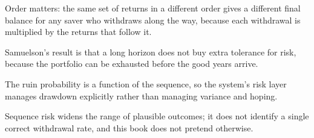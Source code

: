 \begin{keytakeaways}
\item Order matters: the same set of returns in a different order gives a
different final balance for any saver who withdraws along the way, because
each withdrawal is multiplied by the returns that follow it.
\item Samuelson's result is that a long horizon does not buy extra
tolerance for risk, because the portfolio can be exhausted before the good
years arrive.
\item The ruin probability is a function of the sequence, so the system's
risk layer manages drawdown explicitly rather than managing variance and
hoping.
\item Sequence risk widens the range of plausible outcomes; it does not
identify a single correct withdrawal rate, and this book does not pretend
otherwise.
\end{keytakeaways}
